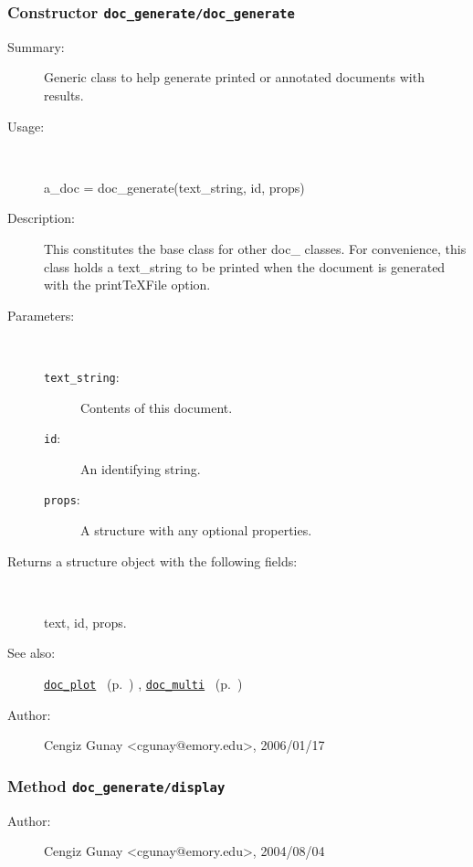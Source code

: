 \subsubsection[Constructor \texttt{doc\_generate}]{Constructor \texttt{doc\_generate/doc\_generate}}%
%
\label{ref_doc_generate__doc_generate}%
\hypertarget{ref_doc_generate__doc_generate}{}%
\begin{description}
\item[Summary:]Generic class to help generate printed or annotated documents with results.
%
\item[Usage:]~%
\begin{lyxcode}%
a\_doc = doc\_generate(text\_string, id, props)
%
\end{lyxcode}%
%
\item[Description:]%
This constitutes the base class for other doc\_ classes. For convenience,
 this class holds a text\_string to be printed when the document is generated
 with the printTeXFile option.
\item[Parameters:]~
\begin{description}%
\item[\texttt{text\_string}:]
 Contents of this document.
\item[\texttt{id}:]
 An identifying string.
\item[\texttt{props}:]
 A structure with any optional properties.
\end{description}%
%
\item[Returns a structure object with the following fields:]~

	text, id, props.
%
%
\item[See also:]%
\hyperlink{ref_doc_plot}{\texttt{doc\_plot}}%
\ (p.~\pageref{ref_doc_plot})%
%
, \hyperlink{ref_doc_multi}{\texttt{doc\_multi}}%
\ (p.~\pageref{ref_doc_multi})%
%
%
\item[Author:]%
Cengiz Gunay <cgunay@emory.edu>, 2006/01/17%
\end{description}
\methodline%
\subsubsection[Method \texttt{display}]{Method \texttt{doc\_generate/display}}%
%
\label{ref_doc_generate__display}%
\hypertarget{ref_doc_generate__display}{}%
\begin{description}
%
%
%
%
%
%
%
\item[Author:]%
Cengiz Gunay <cgunay@emory.edu>, 2004/08/04%
\end{description}
\methodline%
